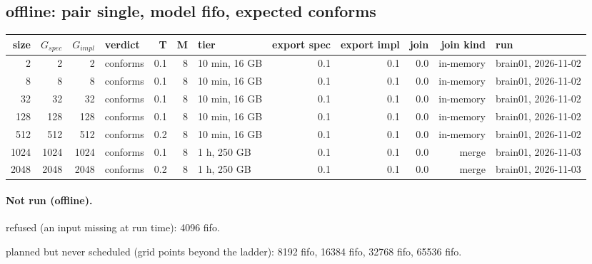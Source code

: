 \documentclass[10pt]{article}
\begin{document}
\subsection*{offline: pair \textsf{single}, model fifo, expected conforms}
\begin{longtable}{@{}rrrlrrlrrrrl@{}}
\toprule
size & $G_{\mathit{spec}}$ & $G_{\mathit{impl}}$ & verdict & T & M & tier & export spec & export impl & join & join kind & run \\
\midrule
\endhead
\color{red} 2 & 2 & 2 & conforms & 0.1 & 8 & 10 min, 16 GB & 0.1 & 0.1 & 0.0 & in-memory & brain01, 2026-11-02 \\
\color{red} 8 & 8 & 8 & conforms & 0.1 & 8 & 10 min, 16 GB & 0.1 & 0.1 & 0.0 & in-memory & brain01, 2026-11-02 \\
\color{red} 32 & 32 & 32 & conforms & 0.1 & 8 & 10 min, 16 GB & 0.1 & 0.1 & 0.0 & in-memory & brain01, 2026-11-02 \\
\color{red} 128 & 128 & 128 & conforms & 0.1 & 8 & 10 min, 16 GB & 0.1 & 0.1 & 0.0 & in-memory & brain01, 2026-11-02 \\
\color{red} 512 & 512 & 512 & conforms & 0.2 & 8 & 10 min, 16 GB & 0.1 & 0.1 & 0.0 & in-memory & brain01, 2026-11-02 \\
\color{blue} 1024 & 1024 & 1024 & conforms & 0.1 & 8 & 1 h, 250 GB & 0.1 & 0.1 & 0.0 & merge & brain01, 2026-11-03 \\
\color{blue} 2048 & 2048 & 2048 & conforms & 0.2 & 8 & 1 h, 250 GB & 0.1 & 0.1 & 0.0 & merge & brain01, 2026-11-03 \\
\bottomrule
\end{longtable}
\paragraph{Not run (offline).}
refused (an input missing at run time): 4096 fifo.\par
planned but never scheduled (grid points beyond the ladder): 8192 fifo, 16384 fifo, 32768 fifo, 65536 fifo.\par
\end{document}
